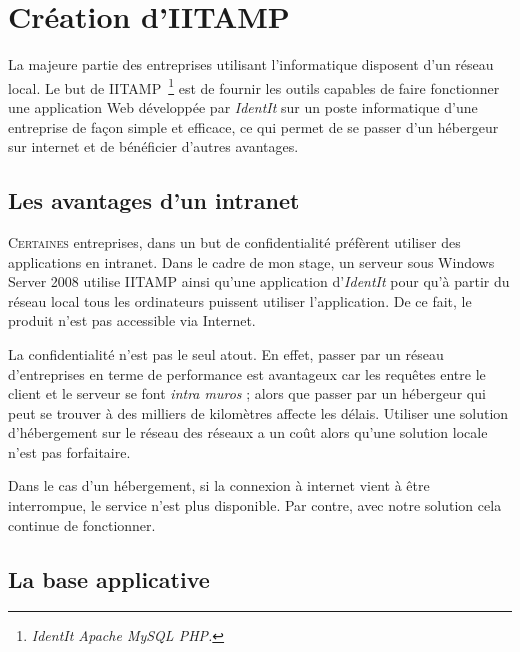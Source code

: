 \chapter{Création d'IITAMP} %
\label{cha:Création d'IITAMP}

\begin{it}

  La majeure partie des entreprises utilisant l'informatique disposent
  d'un réseau local. Le but de IITAMP\, \footnote{\emph{IdentIt Apache
  MySQL PHP.}} est de fournir les outils capables de faire fonctionner
  une application Web développée par \emph{IdentIt} sur un poste
  informatique d'une entreprise de façon simple et efficace, ce qui
  permet de se passer d'un hébergeur sur internet et de bénéficier
  d'autres avantages.

\end{it}

\section{Les avantages d'un intranet} %
\label{sec:Les avantages d'un intranet}

\lettrine{C}{ertaines} entreprises, dans un but de confidentialité
préfèrent utiliser des applications en intranet. Dans le cadre de mon
stage, un serveur sous Windows Server 2008 utilise IITAMP ainsi qu'une
application d'\emph{IdentIt} pour qu'à partir du réseau local tous les
ordinateurs puissent utiliser l'application. De ce fait, le produit
n'est pas accessible via Internet.

La confidentialité n'est pas le seul atout. En effet, passer par un
réseau d'entreprises en terme de performance est avantageux car les
requêtes entre le client et le serveur se font \emph{intra muros} ;
alors que passer par un hébergeur qui peut se trouver à des milliers de
kilomètres affecte les délais. Utiliser une solution d'hébergement sur
le réseau des réseaux a un coût alors qu'une solution locale n'est pas
forfaitaire.

Dans le cas d'un hébergement, si la connexion à internet vient à être
interrompue, le service n'est plus disponible. Par contre, avec notre
solution cela continue de fonctionner.

\section{La base applicative} %
\label{sec:La base applicative}

